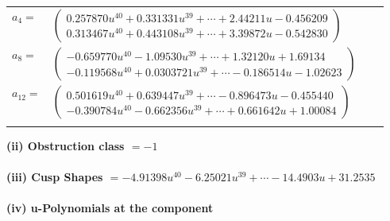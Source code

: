 \documentclass[1p]{elsarticle_modified}
\theoremstyle{definition}
\begin{document}
\begin{tabular}{m{7pt} m{180pt} m{7pt} m{180pt} }
\flushright $a_{4}=$&$\begin{pmatrix}0.257870 u^{40}+0.331331 u^{39}+\cdots+2.44211 u-0.456209\\0.313467 u^{40}+0.443108 u^{39}+\cdots+3.39872 u-0.542830\end{pmatrix}$ \\
\flushright $a_{8}=$&$\begin{pmatrix}-0.659770 u^{40}-1.09530 u^{39}+\cdots+1.32120 u+1.69134\\-0.119568 u^{40}+0.0303721 u^{39}+\cdots-0.186514 u-1.02623\end{pmatrix}$ \\
\flushright $a_{12}=$&$\begin{pmatrix}0.501619 u^{40}+0.639447 u^{39}+\cdots-0.896473 u-0.455440\\-0.390784 u^{40}-0.662356 u^{39}+\cdots+0.661642 u+1.00084\end{pmatrix}$\\&\end{tabular}
\flushleft \textbf{(ii) Obstruction class $= -1$}\\~\\
\flushleft \textbf{(iii) Cusp Shapes $= -4.91398 u^{40}-6.25021 u^{39}+\cdots-14.4903 u+31.2535$}\\~\\
\newpage\renewcommand{\arraystretch}{1}
\flushleft \textbf{(iv) u-Polynomials at the component}\newline \\
\end{document}
